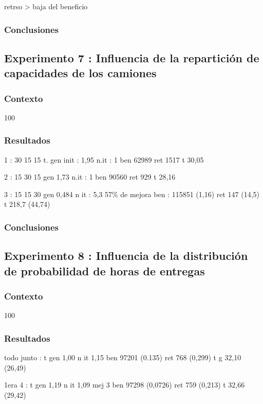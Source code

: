 \documentclass{article}
\begin{document}
retrso > baja del beneficio


\subsubsection{Conclusiones}

\subsection{Experimento 7 : Influencia de la repartición de capacidades
de los camiones}

\subsubsection{Contexto}
100

\subsubsection{Resultados}

1 : 30 15 15
t. gen init : 1,95
n.it : 1
ben 62989
ret 1517
t 30,05

2 : 15 30 15
gen 1,73
n.it : 1
ben 90560
ret 929
t 28,16

3 : 15 15 30
gen 0,484
n it : 5,3
57\% de mejora
ben : 115851 (1,16)
ret 147 (14,5)
t 218,7 (44,74)

\subsubsection{Conclusiones}

\subsection{Experimento 8 : Influencia de la distribución de probabilidad
de horas de entregas}

\subsubsection{Contexto}
100

\subsubsection{Resultados}

todo junto :
t gen 1,00
n it 1,15
ben 97201 (0.135)
ret 768 (0,299)
t g 32,10 (26,49)

1era 4 :
t gen 1,19
n it 1,09
mej 3
ben 97298 (0,0726)
ret 759 (0,213)
t 32,66 (29,42)
\end{document}

